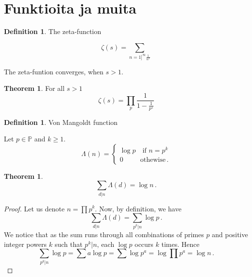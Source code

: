 \documentclass{article}
\theoremstyle{definition}
\newtheorem{definition}[subsection]{Definition}
\newtheorem{theorem}[subsection]{Theorem}
\begin{document}
\section{Funktioita ja muita}

\begin{definition}{The zeta-function}

\begin{equation*}
    \zeta(s) = \sum_{n=1]^\infty \frac{1}{n^s}}
\end{equation*}

The zeta-funtion converges, when $s>1$.

\begin{theorem}
\label{lemma:zeta}
For all $s>1$
\begin{equation*}
    \zeta(s) = \prod_p \frac{1}{1-\frac{1}{p^s}}
\end{equation*}
\end{theorem}

\end{definition}

\begin{definition}
Von Mangoldt function

Let $p\in\mathbb{P}$ and $k\geq1$.
\begin{equation*}
    \Lambda(n) =
    \begin{cases}
    \log p \quad \text{if } n=p^k\\
    0 \quad\quad\,\,\, \text{othewise}\,.
    \end{cases}
\end{equation*}
\end{definition}

\begin{theorem}
\label{thm:lambdaf}
\begin{equation*}
    \sum_{d\vert n} \Lambda(d) = \log n\,.
\end{equation*}
\begin{proof}
Let us denote $n=\prod p^k$. Now, by definition, we have
\begin{equation*}
    \sum_{d\vert n} \Lambda(d) = \sum_{p^k\vert n} \log p\,.
\end{equation*}
We notice that as the sum runs through all combinations of primes $p$ and positive integer powers $k$ such that $p^k\vert n$, each $\log p$ occurs $k$ times. Hence
\begin{equation*}
    \sum_{p^k\vert n} \log p = \sum a \log p = \sum \log p^a = \log \prod p^a = \log n\,.
\end{equation*}
\end{proof}
\end{theorem}
\end{document}
